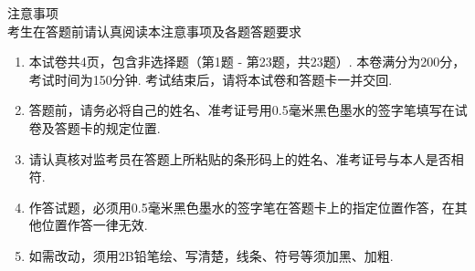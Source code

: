 \documentclass[12pt,space]{ctexart} %
\begin{document}
\juemi%
{\centering\heiti 注意事项 \\}
{\heiti 考生在答题前请认真阅读本注意事项及各题答题要求}
\begin{enumerate}[itemsep=-0.3em,topsep=0pt]
\item 本试卷共4页，包含非选择题（第1题 - 第23题，共23题）. 本卷满分为200分，考试时间为150分钟. 考试结束后，请将本试卷和答题卡一并交回. 
\item 答题前，请务必将自己的姓名、准考证号用0.5毫米黑色墨水的签字笔填写在试卷及答题卡的规定位置. 
\item 请认真核对监考员在答题上所粘贴的条形码上的姓名、准考证号与本人是否相符. 
\item 作答试题，必须用0.5毫米黑色墨水的签字笔在答题卡上的指定位置作答，在其他位置作答一律无效. 
\item 如需改动，须用2B铅笔绘、写清楚，线条、符号等须加黑、加粗. 
\end{enumerate}
\end{document}
